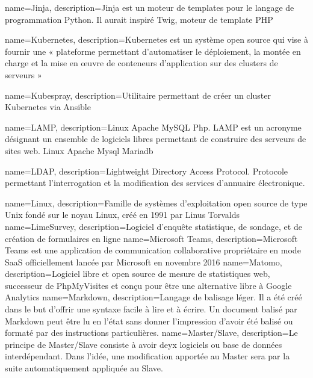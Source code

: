 {
    name=Jinja,
    description={Jinja est un moteur de templates pour le langage de programmation Python. Il aurait inspiré Twig, moteur de template PHP}
}


{
    name=Kubernetes,
    description={Kubernetes est un système open source qui vise à fournir une « plateforme permettant d'automatiser le déploiement, la montée en charge et la mise en œuvre de conteneurs d'application sur des clusters de serveurs »}
}

{
    name=Kubespray,
    description={Utilitaire permettant de créer un cluster Kubernetes via Ansible}
}

{
    name=LAMP,
    description={Linux Apache MySQL Php. LAMP est un acronyme désignant un ensemble de logiciels libres permettant de construire des serveurs de sites web. Linux Apache Mysql Mariadb}
}

{
    name=LDAP,
    description={Lightweight Directory Access Protocol. Protocole permettant l'interrogation et la modification des services d'annuaire électronique.}
}

{
    name=Linux,
    description={Famille de systèmes d'exploitation open source de type Unix fondé sur le noyau Linux, créé en 1991 par Linus Torvalds}
}
{
    name=LimeSurvey,
    description={Logiciel d'enquête statistique, de sondage, et de création de formulaires en ligne}
}
{
    name=Microsoft Teams,
    description={Microsoft Teams est une application de communication collaborative propriétaire en mode SaaS officiellement lancée par Microsoft en novembre 2016}
}
{
    name=Matomo,
    description={Logiciel libre et open source de mesure de statistiques web, successeur de PhpMyVisites et conçu pour être une alternative libre à Google Analytics}
}
{
    name=Markdown,
    description={Langage de balisage léger. Il a été créé dans le but d'offrir une syntaxe facile à lire et à écrire. Un document balisé par Markdown peut être lu en l'état sans donner l’impression d'avoir été balisé ou formaté par des instructions particulières.}
}
{
    name=Master/Slave,
    description={Le principe de Master/Slave consiste à avoir deyx logiciels ou base de données interdépendant. Dans l'idée, une modification apportée au Master sera par la suite automatiquement appliquée au Slave.}
}

